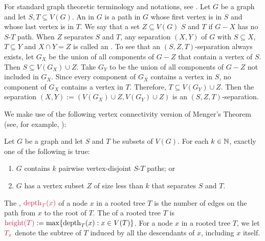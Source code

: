 \documentclass{patmorin}
\newcommand{\pat}[1]{\textcolor{Blue}{[Pat: #1]}}
\DeclareMathOperator{\depth}{depth}
\DeclareMathOperator{\height}{height}
\newcommand{\hussein}[1]{\textcolor{purple}{HH: #1}}
\begin{document}
For standard graph theoretic terminology and notations, see \citet{diestel2017graph}.
Let $G$ be a graph and let $S,T\subseteq V(G)$. An  in $G$ is a path in $G$ whose first vertex is in $S$ and whose last vertex is in $T$.  We say that a set $Z\subseteq V(G)$  $S$ and $T$ if $G-X$ has no $S$-$T$ path.  When $Z$ separates $S$ and $T$, any separation $(X,Y)$ of $G$ with $S\subseteq X$, $T\subseteq Y$ and $X\cap Y=Z$ is called an . To see that an $(S,Z,T)$-separation always exists, let $G_X$ be the union of all components of $G-Z$ that contain a vertex of $S$. Then $S\subseteq V(G_X)\cup Z$. Take $G_Y$ to be the union of all components of $G-Z$ not included in $G_X$. Since  every component of $G_X$ contains a vertex in $S$, no component of $G_X$ contains a vertex in $T$.  Therefore, $T\subseteq V(G_Y)\cup Z$.  Then the separation $(X,Y):=(V(G_X)\cup Z, V(G_Y)\cup Z)$ is an $(S,Z,T)$-separation.

We make use of the following vertex connectivity version of Menger's Theorem (see, for example, \citet[Theorem~3.3.1]{diestel2017graph}): \

\begin{thm}\label{menger}
  Let $G$ be a graph and let $S$ and $T$ be subsets of $V(G)$. For each $k\in\mathbb{N}$, exactly one of the following is true:
  \begin{enumerate}[nosep,nolistsep,label=\rm(\roman*),ref=(\roman*)2]
      \item $G$ contains $k$ pairwise vertex-disjoint $S$-$T$ paths; or
      \item $G$ has a vertex subset $Z$ of size less than $k$ that separates $S$ and $T$.
  \end{enumerate}
\end{thm}

The , $\mathdefin{\depth_T(x)}$ of a node $x$ in a rooted tree $T$ is the number of edges on the path from $x$ to the root of $T$. The  of a rooted tree $T$ is $\mathdefin{\height(T)}:=\max\{\depth_T(x):x\in V(T)\}$. For a node $x$ in a rooted tree $T$, we let $\mathdefin{T_x}$ denote the subtree of $T$ induced by all the descendants of $x$, including $x$ itself.
\end{document}
